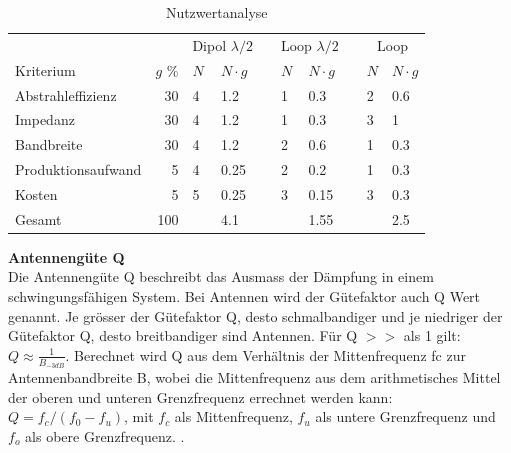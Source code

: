 \begin{table}[!ht]
 \centering
 \begin{tabular}{l r l l l l l l l l} \toprule 
 && \multicolumn{2}{c}{Dipol $\lambda/2$} && \multicolumn{2}{c}{Loop $\lambda/2$} && \multicolumn{2}{c}{Loop} \\ \cmidrule{3-4} \cmidrule{6-7} \cmidrule{9-10}
 	Kriterium 	& $g$ \% 		& $N$ & $N\cdot g$ 	&& $N$ & $N\cdot g$ 		&& $N$ 	& $N\cdot g$ \\ \midrule
 	Abstrahleffizienz	& 	30 	& 4 & 1.2 	&& 1 & 0.3 	&& 2 	& 0.6 \\
 	Impedanz 			& 	30 	& 4 & 1.2 	&& 1 & 0.3 	&& 3 	& 1 \\
	Bandbreite 			&	30	& 4 	& 1.2 	&& 2 & 0.6 	&& 1		& 0.3	\\
 	Produktionsaufwand 	& 	5 	& 4 & 0.25 	&& 2 & 0.2 	&& 1 	& 0.3 \\
 	Kosten 				& 	5 	& 5 & 0.25 	&& 3 & 0.15 	&& 3 	& 0.3 \\
 \hline
 Gesamt 					& 100 	& & 4.1 		&& 	& 1.55 	&& 		& 2.5 \\ \bottomrule
 \end{tabular}
 \caption{Nutzwertanalyse }
 \label{nutzwertEvaluation}
\end{table}


\textbf{Antennengüte Q}\\
Die Antennengüte Q beschreibt das Ausmass der Dämpfung in einem schwingungsfähigen System. Bei Antennen wird der Gütefaktor auch Q Wert genannt. Je grösser der Gütefaktor Q, desto schmalbandiger und je niedriger der Gütefaktor Q, desto breitbandiger sind Antennen. Für Q  $>>$ als 1 gilt: $Q \approx\frac{1}{B_{-3dB}}$. Berechnet wird Q aus dem Verhältnis der Mittenfrequenz fc zur Antennenbandbreite B, wobei die Mittenfrequenz aus dem arithmetisches Mittel der oberen und unteren Grenzfrequenz errechnet werden kann: $Q = f_c/(f_0-f_u)$, mit $f_c$ als Mittenfrequenz, $f_u$ als untere Grenzfrequenz und $f_o$ als obere Grenzfrequenz. \cite{Guetefaktor_Q}.\\

